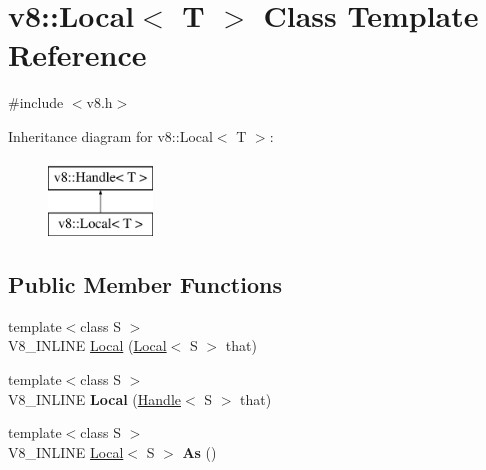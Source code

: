\hypertarget{classv8_1_1Local}{\section{v8\-:\-:Local$<$ T $>$ Class Template Reference}
\label{classv8_1_1Local}
}


{\ttfamily \#include $<$v8.\-h$>$}

Inheritance diagram for v8\-:\-:Local$<$ T $>$\-:\begin{figure}[H]
\begin{center}
\leavevmode
\includegraphics[height=2.000000cm]{classv8_1_1Local}
\end{center}
\end{figure}
\subsection*{Public Member Functions}
\begin{DoxyCompactItemize}
\item 
{\footnotesize template$<$class S $>$ }\\V8\-\_\-\-I\-N\-L\-I\-N\-E \hyperlink{classv8_1_1Local_a18d761713c1062a38f58a568fffe8f80}{Local} (\hyperlink{classv8_1_1Local}{Local}$<$ S $>$ that)
\item 
\hypertarget{classv8_1_1Local_a857c392e721d98a691cf638cc9ea1e8e}{{\footnotesize template$<$class S $>$ }\\V8\-\_\-\-I\-N\-L\-I\-N\-E {\bfseries Local} (\hyperlink{classv8_1_1Handle}{Handle}$<$ S $>$ that)}\label{classv8_1_1Local_a857c392e721d98a691cf638cc9ea1e8e}

\item 
\hypertarget{classv8_1_1Local_a18b55bc71ce2dcd084887097be4399eb}{{\footnotesize template$<$class S $>$ }\\V8\-\_\-\-I\-N\-L\-I\-N\-E \hyperlink{classv8_1_1Local}{Local}$<$ S $>$ {\bfseries As} ()}\label{classv8_1_1Local_a18b55bc71ce2dcd084887097be4399eb}

\end{DoxyCompactItemize}
